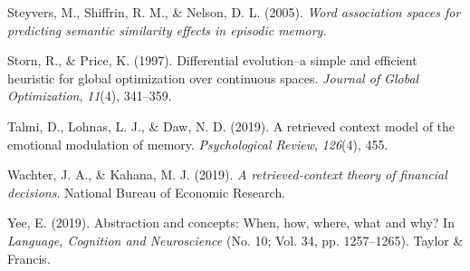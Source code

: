 \documentclass[
  letterpaper,
  DIV=11,
  numbers=noendperiod]{scrreport}
\newlength{\cslhangindent}
\newlength{\cslentryspacingunit} %
\newenvironment{CSLReferences}[2] %
 {%
  \setlength{\parindent}{0pt}
  \ifodd #1
  \let\oldpar\par
  \def\par{\hangindent=\cslhangindent\oldpar}
  \fi
  \setlength{\parskip}{#2\cslentryspacingunit}
 }%
 {}
\begin{document}
\begin{CSLReferences}{1}{0}
\leavevmode{}%
Steyvers, M., Shiffrin, R. M., \& Nelson, D. L. (2005). \emph{Word
association spaces for predicting semantic similarity effects in
episodic memory.}

\leavevmode{}%
Storn, R., \& Price, K. (1997). Differential evolution--a simple and
efficient heuristic for global optimization over continuous spaces.
\emph{Journal of Global Optimization}, \emph{11}(4), 341--359.

\leavevmode{}%
Talmi, D., Lohnas, L. J., \& Daw, N. D. (2019). A retrieved context
model of the emotional modulation of memory. \emph{Psychological
Review}, \emph{126}(4), 455.

\leavevmode{}%
Wachter, J. A., \& Kahana, M. J. (2019). \emph{A retrieved-context
theory of financial decisions}. National Bureau of Economic Research.

\leavevmode{}%
Yee, E. (2019). Abstraction and concepts: When, how, where, what and
why? In \emph{Language, Cognition and Neuroscience} (No. 10; Vol. 34,
pp. 1257--1265). Taylor \& Francis.

\end{CSLReferences}


\hypertarget{section}{%
\chapter{}\label{section}}
\end{document}
